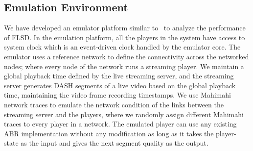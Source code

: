 \subsection{Emulation Environment}
\label{sec:simulatorprop}
We have developed an emulator platform similar to~\cite{Pensieve} to analyze the performance of FLSD. In the emulation platform, all the players in the system have access to system clock which is an event-driven clock handled by the emulator core. The emulator uses a reference network to define the connectivity across the networked nodes; where every node of the network runs a streaming player. %
We maintain a global playback time defined by the live streaming server, and the streaming server generates DASH segments of a live video based on the global playback time, maintaining the video frame recording timestamps. We use Mahimahi \cite{mahimahi} network traces to emulate the network condition of the links between the streaming server and the players, where we randomly assign different Mahimahi traces to every player in a network. The emulated player can use any existing ABR implementation without any modification as long as it takes the player-state as the input and gives the next segment quality as the output. 
